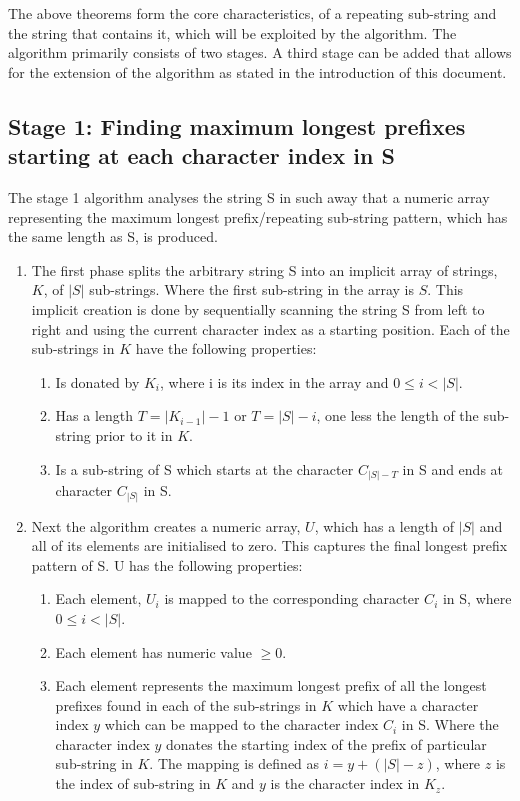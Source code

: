 \documentclass[12pt]{article}
\begin{document}
\begin{flushleft}
	The above theorems form the core characteristics, of a repeating sub-string and the string that contains it, which will be exploited by the algorithm. The algorithm primarily consists of two stages. A third stage can be added that allows for the extension of the algorithm as stated in the introduction of this document.
	\newpage
	\subsection{Stage 1: Finding maximum longest prefixes starting at each character index in S}
		The stage 1 algorithm analyses the string S in such away that a numeric array representing the maximum longest prefix/repeating sub-string pattern, which has the same length as S, is produced. 
	
		\begin{enumerate}	
		\item The first phase splits the arbitrary string S into an implicit array of strings, $K$, of $|S|$ sub-strings. Where the first sub-string in the array is $S$. This implicit creation is done by sequentially scanning the string S from left to right and using the current character index as a starting position.    
		Each of the sub-strings in $K$ have the following properties:
			\begin{enumerate}
				\item Is donated by $K_{i}$, where i is its index in the array and $ 0 \le i < |S|$.
				\item Has a length $T = |K_{i-1}| - 1$ or $T = |S| - i$, one less the length of the sub-string prior to it in $K$.
				\item Is a sub-string of S which starts at the character $C_{|S| - T} $ in S and ends at character $C_{|S|}$ in S.
			\end{enumerate}		
		
		\item Next the algorithm creates a numeric array, $U$, which has a length of $|S|$ and all of its elements are initialised to zero. This captures the final longest prefix pattern of S.  
		U has the following properties:
			\begin{enumerate}
				\item Each element, $U_{i}$ is mapped to the corresponding character $C_{i}$ in S, where $ 0 \le i < |S|$.
				\item Each element has numeric value $\ge 0$.
				\item Each element represents the maximum longest prefix of all the longest prefixes found in each of the sub-strings in $K$ which have a character index $y$ which can be mapped to the character index $C_{i}$ in S. Where the character index $y$ donates the starting index of the prefix of particular sub-string in $K$. The mapping is defined as $i = y + (|S| - z)$, where $z$ is the index of sub-string in $K$ and $y$ is the character index in $K_{z}$. 
			\end{enumerate}
		

\end{enumerate}
\end{flushleft}
\end{document}
